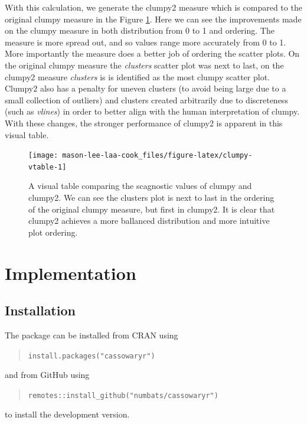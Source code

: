 With this calculation, we generate the clumpy2 measure which is compared to the original clumpy measure in the Figure \ref{fig:clumpy-vtable}. Here we can see the improvements made on the clumpy measure in both distribution from 0 to 1 and ordering. The measure is more spread out, and so values range more accurately from 0 to 1. More importantly the measure does a better job of ordering the scatter plots. On the original clumpy measure the \emph{clusters} scatter plot was next to last, on the clumpy2 measure \emph{clusters} is is identified as the most clumpy scatter plot. Clumpy2 also has a penalty for uneven clusters (to avoid being large due to a small collection of outliers) and clusters created arbitrarily due to discreteness (such as \emph{vlines}) in order to better align with the human interpretation of clumpy. With these changes, the stronger performance of clumpy2 is apparent in this visual table.

\begin{figure}
\texttt{[image: mason-lee-laa-cook\_files/figure-latex/clumpy-vtable-1]} \caption{A visual table comparing the scagnostic values of clumpy and clumpy2. We can see the clusters plot is next to last in the ordering of the original clumpy measure, but first in clumpy2. It is clear that clumpy2 achieves a more ballanced distribution and more intuitive plot ordering.}\label{fig:clumpy-vtable}
\end{figure}

\section{Implementation}\label{implementation}

\subsection{Installation}\label{installation}

The package can be installed from CRAN using

\begin{quote}
\texttt{install.packages("cassowaryr")}
\end{quote}

and from GitHub using

\begin{quote}
\texttt{remotes::install\_github("numbats/cassowaryr")}
\end{quote}

to install the development version.

